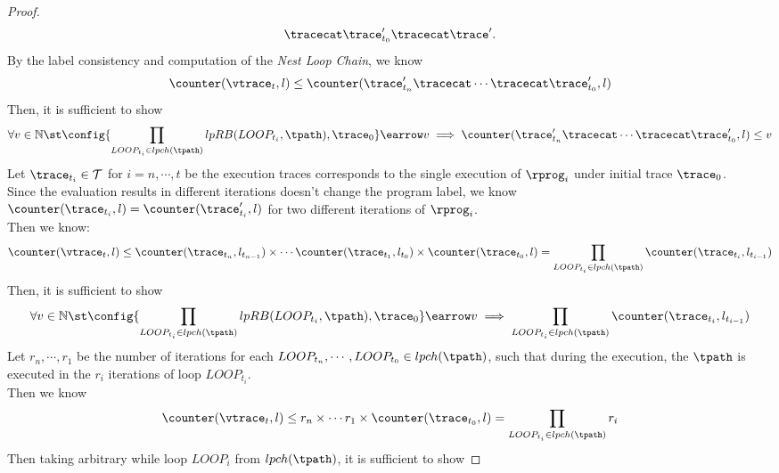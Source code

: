 \begin{proof}
\[\begin{array}{l}
{        \tracecat \trace_{t_0}' \tracecat \trace'}.
          \end{array}
        \]
        By the label consistency and computation of the 
        \emph{Nest Loop Chain}, we know
        \[
          \counter(\vtrace_t, l) \leq \counter(\trace_{t_n}' \tracecat \cdots 
          \tracecat \trace_{t_0}', l)
          \] 
        Then, it is sufficient to show 
        \[
          \forall v \in \mathbb{N} \st 
        \config{\prod_{LOOP_{t_i} \in lpch(\tpath)} lpRB(LOOP_{t_i}, \tpath), \trace_0
        } \earrow v 
        \implies  \counter(\trace_{t_n}' \tracecat \cdots 
        \tracecat \trace_{t_0}', l) \leq v
      \]
%
Let $\trace_{t_i} \in \mathcal{T}$ for $i = n, \cdots, t$ 
be the execution traces corresponds to the single execution of $\rprog_i$ under initial trace $\trace_0$.
\\
Since the evaluation results in different iterations doesn't change the program label,
we know $\counter(\trace_{t_i}, l) = \counter(\trace_{t_i}', l)$ for two different iterations of $\rprog_i$.
\\
Then we know:
\[
  \counter(\vtrace_t, l) \leq 
  \counter(\trace_{t_n}, l_{t_{n-1}}) \times \cdots 
  \counter(\trace_{t_1}, l_{t_{0}}) \times \counter(\trace_{t_0}, l)
  = \prod\limits_{LOOP_{t_i} \in lpch(\tpath)} \counter(\trace_{t_i}, l_{t_{i-1}})
  \]
%
Then, it is sufficient to show 
\[
  \forall v \in \mathbb{N} \st 
\config{\prod_{LOOP_{t_i} \in lpch(\tpath)} lpRB(LOOP_{t_i}, \tpath), \trace_0
} \earrow v 
\implies  
\prod\limits_{LOOP_{t_i} \in lpch(\tpath)} \counter(\trace_{t_i}, l_{t_{i-1}})
\]
%
Let $r_n, \cdots, r_1$ be the number of iterations for each $LOOP_{t_n}, \cdots, LOOP_{t_0} \in lpch(\tpath)$, 
such that
during the execution,
the $\tpath$ is executed in the $r_i$ iterations of loop $LOOP_{t_i}$.
\\
Then we know
\[
  \counter(\vtrace_t, l) \leq 
  r_n \times \cdots 
  r_1 \times \counter(\trace_{t_0}, l)
  = 
  \prod\limits_{LOOP_{t_i} \in lpch(\tpath)} r_i
  \]
%
Then taking arbitrary while loop $LOOP_i$ from $lpch(\tpath)$, it is sufficient to show

\end{proof}
